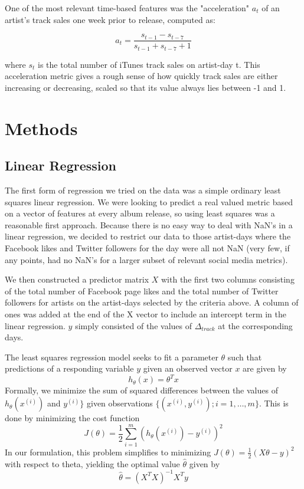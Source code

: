 \documentclass[conference]{IEEEtran}
\begin{document}
One of the most relevant time-based features was the "acceleration" $a_t$ of an artist's track sales one week prior to release, computed as:

$$a_t = \frac{s_{t-1} - s_{t-7}}{s_{t-1} + s_{t-7} + 1}$$

where $s_t$ is the total number of iTunes track sales on artist-day t. This acceleration metric gives a rough sense of how quickly track sales are either increasing or decreasing, scaled so that its value always lies between -1 and 1.

\section{Methods}
\subsection{Linear Regression}
The first form of regression we tried on the data was a simple ordinary least squares linear regression. We were looking to predict a real valued metric based on a vector of features at every album release, so using least squares was a reasonable first approach. Because there is no easy way to deal with NaN's in a linear regression, we decided to restrict our data to those artist-days where the Facebook likes and Twitter followers for the day were all not NaN (very few, if any points, had no NaN's for a larger subset of relevant social media metrics).

We then constructed a predictor matrix $X$ with the first two columns consisting of the total number of Facebook page likes and the total number of Twitter followers for artists on the artist-days selected by the criteria above. A column of ones was added at the end of the X vector to include an intercept term in the linear regression. $y$ simply consisted of the values of $\Delta_{track}$ at the corresponding days.

The least squares regression model seeks to fit a parameter $\theta$ such that predictions of a responding variable $y$ given an observed vector $x$ are given by
$$h_\theta(x) = \theta^T x$$
Formally, we minimize the sum of squared differences between the values of $h_\theta(x^{(i)})$ and $y^{(i)}\}$ given observations $\{(x^{(i)}, y^{(i)}); i = 1,\dots,m\}$. This is done by minimizing the cost function
$$J(\theta) = \frac{1}{2}\sum_{i=1}^{m}(h_\theta(x^{(i)}) - y^{(i)})^2$$
In our formulation, this problem simplifies to minimizing $J(\theta) = \frac{1}{2} (X\theta - y)^2$ with respect to theta, yielding the optimal value $\hat{\theta}$ given by
$$\hat{\theta} = (X^T X)^{-1} X^T y$$
\end{document}
